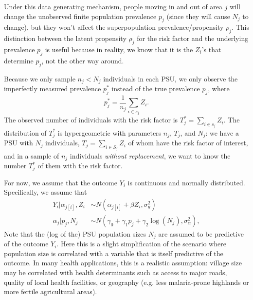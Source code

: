 \documentclass[10pt,a4paper]{article}
\newcommand*{\red}{\textcolor{red}}
\begin{document}
Under this data generating mechanism, people moving in and out of area $j$ will change the unobserved finite population prevalence $p_j$ (since they will cause $N_j$ to change), but they won't affect the superpopulation prevalence/propensity $\rho_j$. This distinction between the latent propensity $\rho_j$ for the risk factor and the underlying prevalence $p_j$ is useful because in reality, we know that it is the $Z_i$'s that determine $p_j$, not the other way around.




Because we only sample $n_j < N_j$ individuals in each PSU, we only observe the imperfectly measured prevalence $p^*_j$ instead of the true prevalence $p_j$, where
\[
	p^*_j = \frac{1}{n_j} \sum_{i \in s_j} Z_i.
\]
The observed number of individuals with the risk factor is $T^*_j = \sum_{i \in s_j} Z_i$. The distribution of $T^*_j$ is hypergeometric with parameters $n_j$, $T_j$, and $N_j$: we have a PSU with $N_j$ individuals, $T_j = \sum_{i \in S_j} Z_i$ of whom have the risk factor of interest, and in a sample of $n_j$ individuals \textit{without replacement}, we want to know the number $T^*_j$ of them with the risk factor.

For now, we assume that the outcome $Y_i$ is continuous and normally distributed. Specifically, we assume that
\begin{align*}
	Y_i | \alpha_{j[i]}, Z_i &\sim N(\alpha_{j[i]} + \beta Z_i, \sigma_y^2) \\
	\alpha_j | p_j, N_j &\sim N(\gamma_0 + \gamma_1 p_j + \gamma_2 \log(N_j), \sigma_{\alpha}^2),
\end{align*}
Note that the (log of the) PSU population sizes $N_j$ are assumed to be predictive of the outcome $Y_i$. Here this is a slight simplification of the scenario where population size is correlated with a variable that is itself predictive of the outcome. In many health applications, this is a realistic assumption: village size may be correlated with health determinants such as access to major roads, quality of local health facilities, or geography (e.g. less malaria-prone highlands or more fertile agricultural areas).
\end{document}
